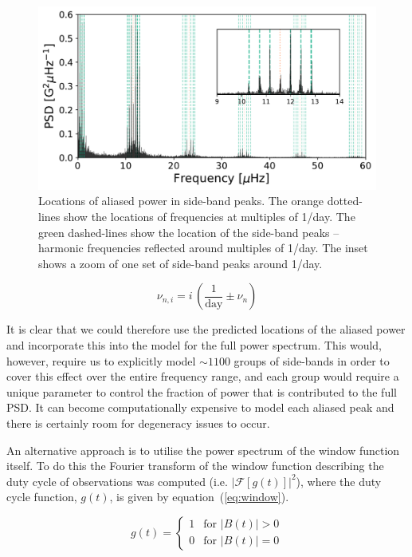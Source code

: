 \begin{figure}[ht!]
	\centering
	\includegraphics[width=\columnwidth]{sideband.pdf}
	\caption{Locations of aliased power in side-band peaks. The orange dotted-lines show the locations of frequencies at multiples of 1/day. The green dashed-lines show the location of the side-band peaks -- harmonic frequencies reflected around multiples of 1/day.  The inset shows a zoom of one set of side-band peaks around 1/day.}
	\label{fig:sideband_locations}
\end{figure}

\begin{equation}
\nu_{n, i} = i \, (\frac{1}{\mathrm{day}} \pm \nu_{n})
\label{eq:sidebands}
\end{equation}

It is clear that we could therefore use the predicted locations of the aliased power and incorporate this into the model for the full power spectrum. This would, however, require us to explicitly model $\sim 1100$ groups of side-bands in order to cover this effect over the entire frequency range, and each group would require a unique parameter to control the fraction of power that is contributed to the full PSD. It can become computationally expensive to model each aliased peak and there is certainly room for degeneracy issues to occur.

An alternative approach is to utilise the power spectrum of the window function itself. To do this the Fourier transform of the window function describing the duty cycle of observations was computed (i.e. $\left|\mathcal{F}\left[g(t)\right]\right|^2$), where the duty cycle function, $g(t)$, is given by equation~(\ref{eq:window}).

\begin{equation}
g(t) = 
\begin{cases} 
1 & \text{for } |B(t)| > 0 \\
0       & \text{for } |B(t)| = 0
\end{cases}
\label{eq:window}
\end{equation}

